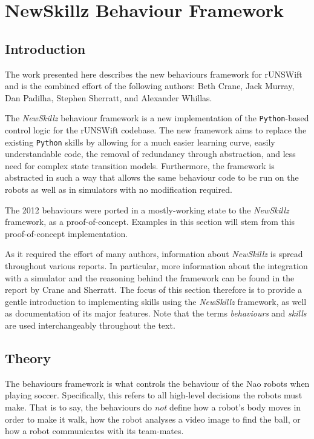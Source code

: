 \chapter{NewSkillz Behaviour Framework}
\label{chap:rl}

\section{Introduction}
The work presented here describes the new behaviours framework for rUNSWift and is the combined effort of the following authors: Beth Crane, Jack Murray, Dan Padilha, Stephen Sherratt, and Alexander Whillas.

The \textit{NewSkillz} behaviour framework is a new implementation of the \verb!Python!-based control logic for the rUNSWift codebase. The new framework aims to replace the existing \verb!Python! skills by allowing for a much easier learning curve, easily understandable code, the removal of redundancy through abstraction, and less need for complex state transition models. Furthermore, the framework is abstracted in such a way that allows the same behaviour code to be run on the robots as well as in simulators with no modification required.

The 2012 behaviours were ported in a mostly-working state to the \textit{NewSkillz} framework, as a proof-of-concept. Examples in this section will stem from this proof-of-concept implementation.

As it required the effort of many authors, information about \textit{NewSkillz} is spread throughout various reports. In particular, more information about the integration with a simulator and the reasoning behind the framework can be found in the report by Crane and Sherratt.\cite{simulator} The focus of this section therefore is to provide a gentle introduction to implementing skills using the \textit{NewSkillz} framework, as well as documentation of its major features. Note that the terms \textit{behaviours} and \textit{skills} are used interchangeably throughout the text.

\section{Theory}

The behaviours framework is what controls the behaviour of the Nao robots when playing soccer. Specifically, this refers to all high-level decisions the robots must make. That is to say, the behaviours do \textit{not} define how a robot's body moves in order to make it walk, how the robot analyses a video image to find the ball, or how a robot communicates with its team-mates.


